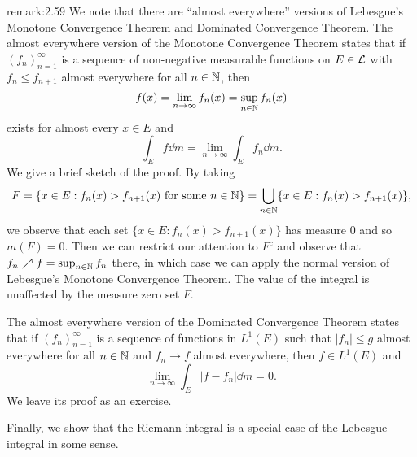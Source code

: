 \begin{remark}{remark:2.59}
    We note that there are ``almost everywhere'' versions of Lebesgue's 
    Monotone Convergence Theorem and Dominated Convergence Theorem. 
    The almost everywhere version of the Monotone Convergence Theorem states that 
    if $(f_n)_{n=1}^\infty$ is a sequence of non-negative measurable functions on 
    $E \in {\cal L}$ with $f_n \leq f_{n+1}$ almost everywhere for all $n \in \mathbb{N}$, 
    then 
    \[ f(x) = \lim_{n\to\infty} f_n(x) = \sup_{n\in\mathbb{N}} f_n(x) \] 
    exists for almost every $x \in E$ and 
    \[ \int_E f\dd m = \lim_{n\to\infty} \int_E f_n\dd m. \] 
    We give a brief sketch of the proof. By taking 
    \[ F = \{x \in E : f_n(x) > f_{n+1}(x) \text{ for some } n \in \mathbb{N}\} 
    = \bigcup_{n\in\mathbb{N}} \{x \in E : f_n(x) > f_{n+1}(x)\}, \] 
    we observe that each set $\{x \in E : f_n(x) > f_{n+1}(x)\}$ has 
    measure $0$ and so $m(F) = 0$. Then we can restrict our attention to 
    $F^c$ and observe that $f_n \nearrow f = \sup_{n\in\mathbb{N}} f_n$ there, in 
    which case we can apply the normal version of Lebesgue's Monotone 
    Convergence Theorem. The value of the integral is unaffected by the 
    measure zero set $F$. 

    The almost everywhere version of the Dominated Convergence Theorem states 
    that if $(f_n)_{n=1}^\infty$ is a sequence of functions in $L^1(E)$ 
    such that $|f_n| \leq g$ almost everywhere for all $n \in \mathbb{N}$ and 
    $f_n \to f$ almost everywhere, then $f \in L^1(E)$ and 
    \[ \lim_{n\to\infty} \int_E |f - f_n|\dd m = 0. \] 
    We leave its proof as an exercise. 
\end{remark}

Finally, we show that the Riemann integral is a special case of the Lebesgue 
integral in some sense. 


